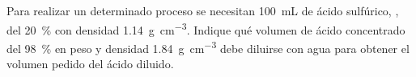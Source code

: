 Para realizar un determinado proceso se necesitan \SI{100}{\milli\liter} de ácido sulfúrico, , del \SI{20}{\percent} con densidad \SI{1,14}{\gram\per\cubic\centi\meter}. Indique qué volumen de ácido concentrado del \SI{98}{\percent} en peso y densidad \SI{1,84}{\gram\per\cubic\centi\meter} debe diluirse con agua para obtener el volumen pedido del ácido diluido.

